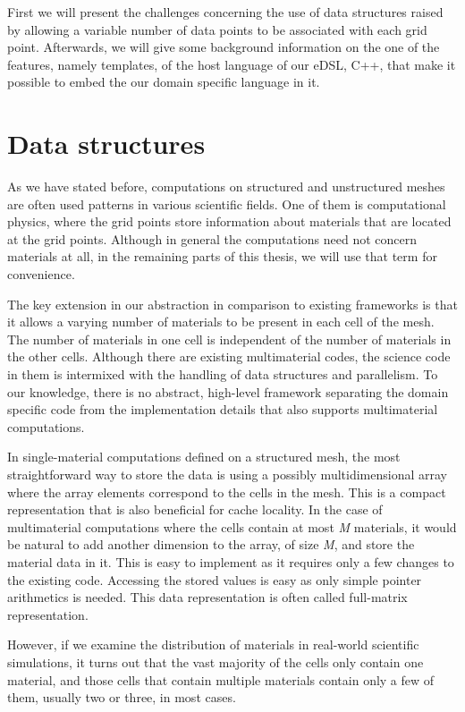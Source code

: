 \documentclass[fontsize=11pt, appendixprefix=true]{scrreprt}
\begin{document}
First we will present the challenges concerning the use of data structures
raised by allowing a variable number of data points to be associated with each
grid point. Afterwards, we will give some background information on the one of
the features, namely templates, of the host language of our eDSL, C++, that make
it possible to embed the our domain specific language in it.

\section{Data structures}

As we have stated before, computations on structured and unstructured meshes are
often used patterns in various scientific fields. One of them is computational
physics, where the grid points store information about materials that are
located at the grid points. Although in general the computations need not
concern materials at all, in the remaining parts of this thesis, we will use
that term for convenience.

The key extension in our abstraction in comparison to existing frameworks is
that it allows a varying number of materials to be present in each cell of the
mesh. The number of materials in one cell is independent of the number of
materials in the other cells. Although there are existing multimaterial codes,
the science code in them is intermixed with the handling of data structures and
parallelism. To our knowledge, there is no abstract, high-level framework
separating the domain specific code from the implementation details that also
supports multimaterial computations.

In single-material computations defined on a structured mesh, the most
straightforward way to store the data is using a possibly multidimensional array
where the array elements correspond to the cells in the mesh. This is a compact
representation that is also beneficial for cache locality. In the case of
multimaterial computations where the cells contain at most \textit{M} materials,
it would be natural to add another dimension to the array, of size \textit{M},
and store the material data in it. This is easy to implement as it requires only
a few changes to the existing code. Accessing the stored values is easy as only
simple pointer arithmetics is needed. This data representation is often called
full-matrix representation.

However, if we examine the distribution of materials in real-world scientific
simulations, it turns out that the vast majority of the cells only contain one
material, and those cells that contain multiple materials contain only a few of
them, usually two or three, in most cases.
\end{document}
